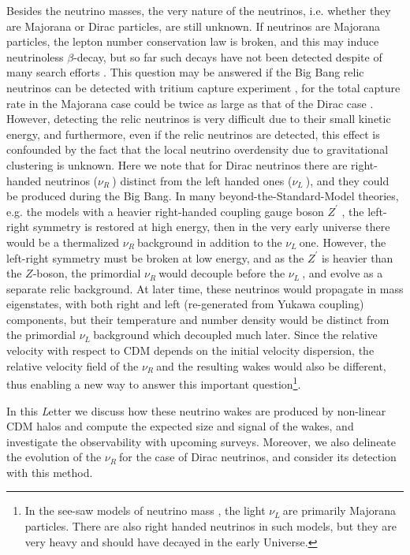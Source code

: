 \documentclass[aps,prl,twocolumn,showpacs,superscriptaddress,groupedaddress,nofootinbib]{revtex4}  %
\newcommand{\nur}{\ensuremath{{\nu_R~}}}
\newcommand{\nul}{\ensuremath{{\nu_L~}}}
\begin{document}
Besides the neutrino masses, the very nature of the neutrinos, i.e. whether
they are Majorana or Dirac particles, are still unknown.
If neutrinos are Majorana particles,
the lepton number conservation law is broken, and this may induce neutrinoless
$\beta$-decay, but so far such decays have not been detected despite of many
search efforts \cite{2013arXiv1310.4340D}. 
This question may be answered if the Big Bang relic neutrinos can be detected
with tritium capture experiment \cite{2013arXiv1307.4738B}, for
the total capture rate in the Majorana case could be twice 
as large as that of the Dirac case \cite{2014JCAP...08..038L}. 
However, detecting the relic neutrinos is very difficult due to their small kinetic energy, 
and furthermore, even if the relic neutrinos are detected, this effect is confounded by the fact that
the local neutrino overdensity due to gravitational clustering is unknown. 
Here we note that for Dirac neutrinos there are 
right-handed neutrinos (\nur) distinct from the left handed ones (\nul), and
they could be produced during the Big Bang. In many beyond-the-Standard-Model 
theories, e.g. the models with a heavier right-handed coupling gauge boson $Z^\prime$ \cite{2009RvMP...81.1199L}, 
the left-right symmetry is restored at high energy, then in the very early universe there would be 
a thermalized \nur background in addition to the \nul  one. However, the left-right 
symmetry must be broken at low energy, and as the $Z^\prime$  is heavier than the $Z$-boson,
the primordial \nur  would decouple before the \nul, and evolve as a
separate relic background. At later time, these neutrinos
would propagate in mass eigenstates, with both right
and left (re-generated from Yukawa coupling) components, 
but their temperature and number density would be 
distinct from the primordial \nul background which decoupled much later. 
Since the relative velocity with respect to CDM depends on the initial velocity
dispersion\cite{Zhu:2013},  
the relative velocity field of the \nur and 
the resulting wakes  would also be different, thus enabling a new
way to answer this important question\footnote{In the see-saw models 
of neutrino mass \cite{2008IJMPA..23.4255X}, 
the light \nul are primarily Majorana particles. 
There are also right handed neutrinos in such models, but they 
are very heavy and should have decayed in the early Universe.}.

In this {\emph Letter} we discuss how these neutrino wakes are produced by
non-linear CDM halos and compute the expected size and signal of the
wakes, and investigate the observability with upcoming surveys. 
Moreover, we also delineate the evolution of the \nur for the 
case of Dirac neutrinos, and consider its detection with this method.
\end{document}
